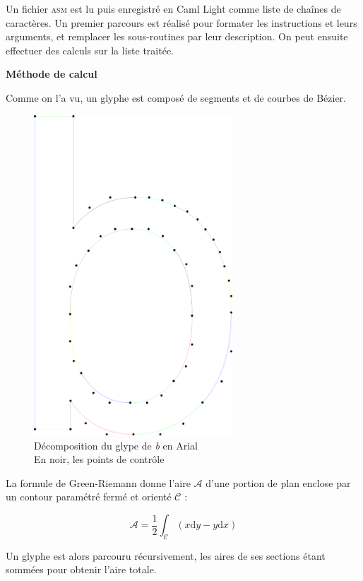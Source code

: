 \documentclass[10pt,twoside,french,a4paper]{article}
\begin{document}
\medskip

Un fichier \textsc{asm} est lu puis enregistré en Caml Light comme liste de chaînes de caractères.
Un premier parcours est réalisé pour formater les instructions et leurs arguments, et remplacer les sous-routines par leur description.
On peut ensuite effectuer des calculs sur la liste traitée.

\medskip

\noindent \textbf{Méthode de calcul}

Comme on l'a vu, un glyphe est composé de segments et de courbes de Bézier.

\begin{figure}[h]
  \begin{center}
    \includegraphics[height=12cm]{Ressources/pdf/b2.pdf}
    \caption{Décomposition du glype de \emph{b} en Arial\\En noir, les points de contrôle}
  \end{center}
\end{figure}

\pagebreak

La formule de Green-Riemann donne l'aire $\mathcal{A}$ d'une portion de plan enclose par un contour paramétré fermé et orienté $\mathcal{C}$ :

\[ \mathcal{A} = \frac{1}{2} \int_{\mathcal{C}} (x \mathrm{d}y - y \mathrm{d}x) \]

\medskip

Un glyphe est alors parcouru récursivement, les aires de ses sections étant sommées pour obtenir l'aire totale.
\end{document}
